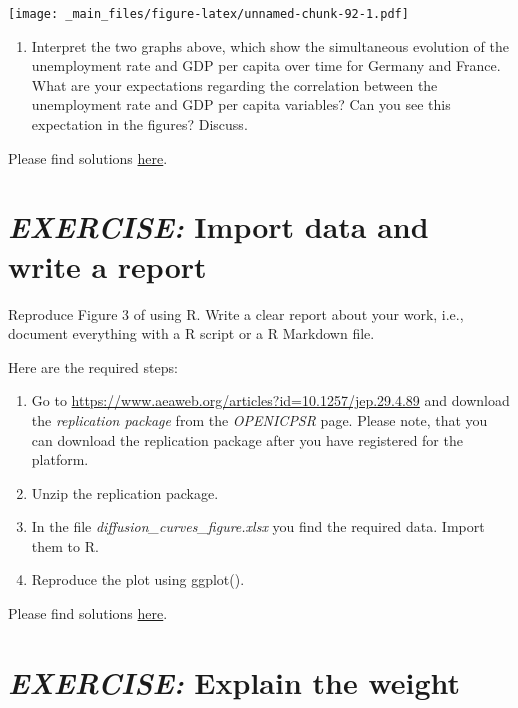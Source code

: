 \documentclass[
  12pt,
  oneside]{book}
\providecommand{\tightlist}{%
  \setlength{\itemsep}{0pt}\setlength{\parskip}{0pt}}
\begin{document}
\texttt{[image: \_main\_files/figure-latex/unnamed-chunk-92-1.pdf]}

\begin{enumerate}
\def\labelenumi{(\arabic{enumi})}
\setcounter{enumi}{23}
\tightlist
\item
  Interpret the two graphs above, which show the simultaneous evolution of the unemployment rate and GDP per capita over time for Germany and France. What are your expectations regarding the correlation between the unemployment rate and GDP per capita variables? Can you see this expectation in the figures? Discuss.
\end{enumerate}

Please find solutions \href{https://raw.githubusercontent.com/hubchev/courses/main/scr/un_gdp_ger_fra.R}{here}.

\hypertarget{exercise-import-data-and-write-a-report}{%
\section*{\texorpdfstring{\emph{EXERCISE:} Import data and write a report}{EXERCISE: Import data and write a report}}\label{exercise-import-data-and-write-a-report}}

Reproduce Figure 3 of \citet[p.~99]{Hortacsu2015Ongoing} using R. Write a clear report about your work, i.e., document everything with a R script or a R Markdown file.

Here are the required steps:

\begin{enumerate}
\def\labelenumi{\arabic{enumi}.}
\tightlist
\item
  Go to \url{https://www.aeaweb.org/articles?id=10.1257/jep.29.4.89} and download the \emph{replication package} from the \emph{OPENICPSR} page. Please note, that you can download the replication package after you have registered for the platform.
\item
  Unzip the replication package.
\item
  In the file \emph{diffusion\_curves\_figure.xlsx} you find the required data. Import them to R.
\item
  Reproduce the plot using ggplot().
\end{enumerate}

Please find solutions \href{https://raw.githubusercontent.com/hubchev/courses/main/scr/hortacsu_figure_3.R}{here}.

\hypertarget{exercise-explain-the-weight}{%
\section*{\texorpdfstring{\emph{EXERCISE:} Explain the weight}{EXERCISE: Explain the weight}}\label{exercise-explain-the-weight}}
\end{document}
